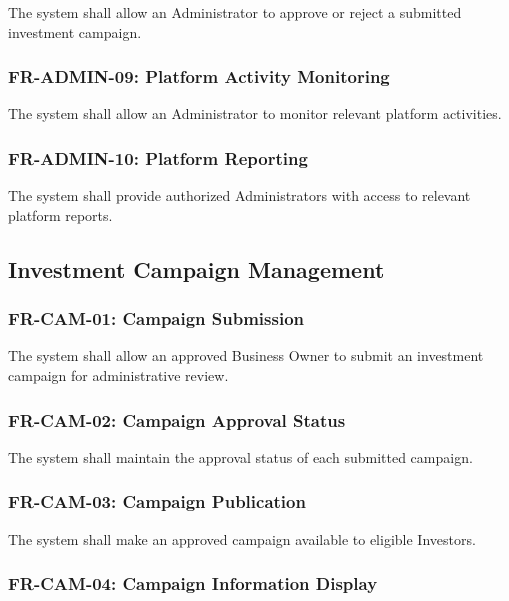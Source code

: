 The system shall allow an Administrator to approve or reject a submitted
investment campaign.

\subsubsection{FR-ADMIN-09: Platform Activity Monitoring}

The system shall allow an Administrator to monitor relevant platform
activities.

\subsubsection{FR-ADMIN-10: Platform Reporting}

The system shall provide authorized Administrators with access to relevant
platform reports.



\subsection{Investment Campaign Management}

\subsubsection{FR-CAM-01: Campaign Submission}

The system shall allow an approved Business Owner to submit an investment
campaign for administrative review.

\subsubsection{FR-CAM-02: Campaign Approval Status}

The system shall maintain the approval status of each submitted campaign.

\subsubsection{FR-CAM-03: Campaign Publication}

The system shall make an approved campaign available to eligible Investors.

\subsubsection{FR-CAM-04: Campaign Information Display}

